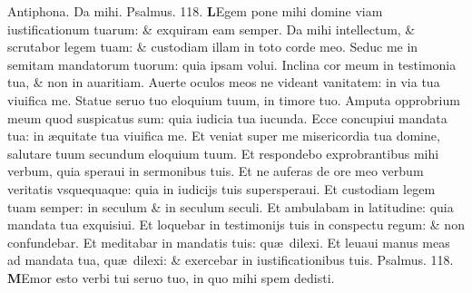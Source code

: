 \documentclass[a5paper,10pt]{book}
\def\ae{æ}
\begin{document}
\begin{multicols*}{2}
\newline \color{red} Antiphona. \color{black} Da mihi. \color{red} Psalmus. \hypertarget{ps118.3}{118.} \color{black}
\lettrine[lines=2]{\bfseries L}{}Egem pone mihi domine viam iustificationum tuarum: \& exquiram eam semper.
\newline \color{red} D\color{black}a mihi intellectum, \& scrutabor legem tuam: \& custodiam illam in toto corde meo.
\newline \color{red} S\color{black}educ me in semitam mandatorum tuorum: quia ipsam volui.
\newline \color{red} I\color{black}nclina cor meum in testimonia tua, \& non in auaritiam.
\newline \color{red} A\color{black}uerte oculos meos ne videant vanitatem: in via tua viuifica me.
\newline \color{red} S\color{black}tatue seruo tuo eloquium tuum, in timore tuo.
\newline \color{red} A\color{black}mputa opprobrium meum quod suspicatus sum: quia iudicia tua iucunda.
\newline \color{red} E\color{black}cce concupiui mandata tua: in \ae quitate tua viuifica me.
\newline \color{red} E\color{black}t veniat super me misericordia tua domine, salutare tuum secundum eloquium tuum.
\newline \color{red} E\color{black}t respondebo exprobrantibus mihi verbum, quia speraui in sermonibus tuis.
\newline \color{red} E\color{black}t ne auferas de ore meo verbum veritatis vsquequaque: quia in iudicijs tuis supersperaui.
\newline \color{red} E\color{black}t custodiam legem tuam semper: in seculum \& in seculum seculi.
\newline \color{red} E\color{black}t ambulabam in latitudine: quia mandata tua exquisiui.
\newline \color{red} E\color{black}t loquebar in testimonijs tuis in conspectu regum: \& non confundebar.
\newline \color{red} E\color{black}t meditabar in mandatis tuis: qu\ae \ dilexi.
\newline \color{red} E\color{black}t leuaui manus meas ad mandata tua, qu\ae \ dilexi: \& exercebar in iustificationibus tuis. \quad \color{red} Psalmus. \hypertarget{ps118.4}{118.} \color{black}
\vspace{-1em}
\lettrine[lines=2]{\bfseries \color{red} M}{}Emor esto verbi tui seruo tuo, in quo mihi spem dedisti.

\end{multicols*}
\end{document}
